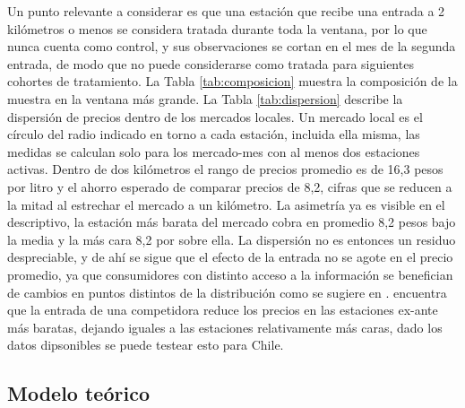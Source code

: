 Un punto relevante a considerar es que una estación que recibe una entrada a 2 kilómetros o menos se considera tratada durante toda la ventana, por lo que nunca cuenta como control, y sus observaciones se cortan en el mes de la segunda entrada, de modo que no puede considerarse como tratada para siguientes cohortes de tratamiento. La Tabla \ref{tab:composicion} muestra la composición de la muestra en la ventana más grande.
La Tabla \ref{tab:dispersion} describe la dispersión de precios dentro de los mercados locales. Un mercado local es el círculo del radio indicado en torno a cada estación, incluida ella misma, las medidas se calculan solo para los mercado-mes con al menos dos estaciones activas. Dentro de dos kilómetros el rango de precios promedio es de 16,3 pesos por litro y el ahorro esperado de comparar precios de 8,2, cifras que se reducen a la mitad al estrechar el mercado a un kilómetro. La asimetría ya es visible en el descriptivo, la estación más barata del mercado cobra en promedio 8,2 pesos bajo la media y la más cara 8,2 por sobre ella. La dispersión no es entonces un residuo despreciable, y de ahí se sigue que el efecto de la entrada no se agote en el precio promedio, ya que consumidores con distinto acceso a la información se benefician de cambios en puntos distintos de la distribución como se sugiere en \textcite{LUCO2019, SOLIS2025}. \textcite{FISCHER2025} encuentra que la entrada de una competidora reduce los precios en las estaciones ex-ante más baratas, dejando iguales a las estaciones relativamente más caras, dado los datos dipsonibles se puede testear esto para Chile. 

\begin{table}[htbp]
    \centering
    \caption{Precios y dispersión de precios a nivel de mercado local, gasolina 93, 2025} \label{tab:dispersion}
    \ajustar{}
    \caption*{\footnotesize Fuente: Precios históricos de bencinaenlinea.cl. Precios en \$/L. Mercado = estación focal y todas las estaciones con precio a 1 (2) km o menos en el mes, solo mercado-mes con al menos dos estaciones con precio. Ahorro esperado de buscar = precio medio $-$ precio mínimo. Percentiles, media y desviación estándar de cada medida entre mercado-mes.}
\end{table}

\subsection{Modelo teórico}

